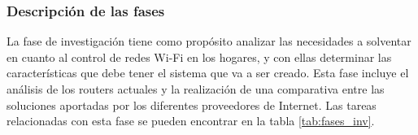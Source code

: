 \documentclass[12pt, twoside]{article}
\begin{document}
        \begin{table}[h!]             
        \centering                  
        \caption{Pruebas de encriptación}
        \label{tab:cripto_tests}
    \end{table}

    \subsubsection{Descripción de las fases}
        La fase de investigación tiene como propósito analizar las necesidades a solventar en cuanto al control de redes Wi-Fi en los hogares, y con ellas determinar las características que debe tener el sistema que va a ser creado. Esta fase incluye el análisis de los routers actuales y la realización de una comparativa entre las soluciones aportadas por los diferentes proveedores de Internet. Las tareas relacionadas con esta fase se pueden encontrar en la tabla \ref{tab:fases_inv}.
\end{document}
